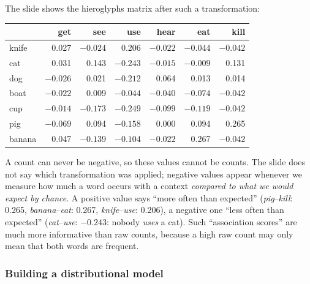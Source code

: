 The slide shows the hieroglyphs matrix after such a transformation:

\begin{center}
\small
\begin{tabular}{@{}l rrrrrr@{}}
\toprule
 & \textbf{get} & \textbf{see} & \textbf{use} & \textbf{hear} & \textbf{eat} & \textbf{kill} \\
\midrule
knife  & 0.027 & $-0.024$ & 0.206 & $-0.022$ & $-0.044$ & $-0.042$ \\
cat    & 0.031 & 0.143 & $-0.243$ & $-0.015$ & $-0.009$ & 0.131 \\
\textcolor{nbred}{dog} & \textcolor{nbred}{$-0.026$} & \textcolor{nbred}{0.021} & \textcolor{nbred}{$-0.212$} & \textcolor{nbred}{0.064} & \textcolor{nbred}{0.013} & \textcolor{nbred}{0.014} \\
boat   & $-0.022$ & 0.009 & $-0.044$ & $-0.040$ & $-0.074$ & $-0.042$ \\
cup    & $-0.014$ & $-0.173$ & $-0.249$ & $-0.099$ & $-0.119$ & $-0.042$ \\
pig    & $-0.069$ & 0.094 & $-0.158$ & 0.000 & 0.094 & 0.265 \\
banana & 0.047 & $-0.139$ & $-0.104$ & $-0.022$ & 0.267 & $-0.042$ \\
\bottomrule
\end{tabular}
\end{center}

\begin{nbintuition}
A count can never be negative, so these values cannot be counts. The slide does not say
which transformation was applied; negative values appear whenever we measure how much a
word occurs with a context \emph{compared to what we would expect by chance}. A positive
value says ``more often than expected'' (\emph{pig}--\emph{kill}: 0.265,
\emph{banana}--\emph{eat}: 0.267, \emph{knife}--\emph{use}: 0.206), a negative one ``less
often than expected'' (\emph{cat}--\emph{use}: $-0.243$: nobody \emph{uses} a cat).
Such ``association scores'' are much more informative than raw counts,
because a high raw count may only mean that both words are frequent.
\end{nbintuition}

\subsubsection{Building a distributional model}

